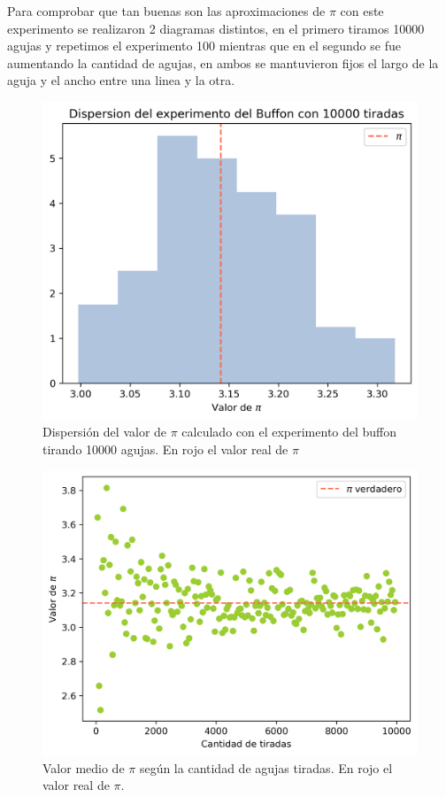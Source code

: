 \documentclass[baaa]{baaa}
\begin{document}
Para comprobar que tan buenas son las aproximaciones de $\pi$ con este experimento se realizaron 2 diagramas distintos, en el primero tiramos 10000 agujas y repetimos el experimento 100 mientras que en el segundo se fue aumentando la cantidad de agujas, en ambos se mantuvieron fijos el largo de la aguja y el ancho entre una linea y la otra.

\begin{figure}[h]
    \centering
    \includegraphics[width=\linewidth]{imagenes/buffon_x10000.png}
    \caption{Dispersión del valor de $\pi$ calculado con el experimento del buffon tirando 10000 agujas. En rojo el valor real de $\pi$}
    \label{fig:buffonx10000}
\end{figure}
\begin{figure}[h]
    \centering
    \includegraphics[width=\linewidth]{imagenes/buffon_conv.png}
    \caption{Valor medio de $\pi$ según la cantidad de agujas tiradas. En rojo el valor real de $\pi$.}
    \label{fig:buffonconv}
\end{figure}
\end{document}
